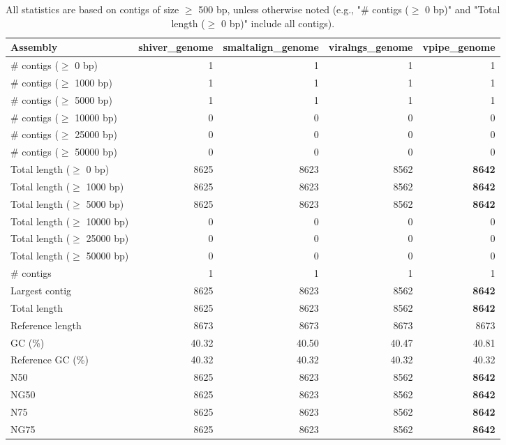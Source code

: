 \documentclass[12pt,a4paper]{article}
\begin{document}
\begin{table}[ht]
\begin{center}
\caption{All statistics are based on contigs of size $\geq$ 500 bp, unless otherwise noted (e.g., "\# contigs ($\geq$ 0 bp)" and "Total length ($\geq$ 0 bp)" include all contigs).}
\begin{tabular}{|l*{4}{|r}|}
\hline
Assembly & shiver\_genome & smaltalign\_genome & viralngs\_genome & vpipe\_genome \\ \hline
\# contigs ($\geq$ 0 bp) & 1 & 1 & 1 & 1 \\ \hline
\# contigs ($\geq$ 1000 bp) & 1 & 1 & 1 & 1 \\ \hline
\# contigs ($\geq$ 5000 bp) & 1 & 1 & 1 & 1 \\ \hline
\# contigs ($\geq$ 10000 bp) & 0 & 0 & 0 & 0 \\ \hline
\# contigs ($\geq$ 25000 bp) & 0 & 0 & 0 & 0 \\ \hline
\# contigs ($\geq$ 50000 bp) & 0 & 0 & 0 & 0 \\ \hline
Total length ($\geq$ 0 bp) & 8625 & 8623 & 8562 & {\bf 8642} \\ \hline
Total length ($\geq$ 1000 bp) & 8625 & 8623 & 8562 & {\bf 8642} \\ \hline
Total length ($\geq$ 5000 bp) & 8625 & 8623 & 8562 & {\bf 8642} \\ \hline
Total length ($\geq$ 10000 bp) & 0 & 0 & 0 & 0 \\ \hline
Total length ($\geq$ 25000 bp) & 0 & 0 & 0 & 0 \\ \hline
Total length ($\geq$ 50000 bp) & 0 & 0 & 0 & 0 \\ \hline
\# contigs & 1 & 1 & 1 & 1 \\ \hline
Largest contig & 8625 & 8623 & 8562 & {\bf 8642} \\ \hline
Total length & 8625 & 8623 & 8562 & {\bf 8642} \\ \hline
Reference length & 8673 & 8673 & 8673 & 8673 \\ \hline
GC (\%) & 40.32 & 40.50 & 40.47 & 40.81 \\ \hline
Reference GC (\%) & 40.32 & 40.32 & 40.32 & 40.32 \\ \hline
N50 & 8625 & 8623 & 8562 & {\bf 8642} \\ \hline
NG50 & 8625 & 8623 & 8562 & {\bf 8642} \\ \hline
N75 & 8625 & 8623 & 8562 & {\bf 8642} \\ \hline
NG75 & 8625 & 8623 & 8562 & {\bf 8642} \\ \hline

\end{tabular}
\end{center}
\end{table}
\end{document}
